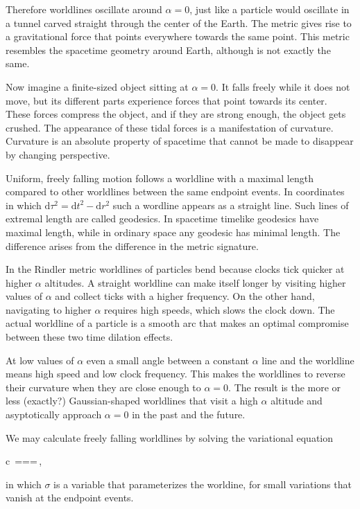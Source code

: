 \documentclass[11pt,oneside%
]{memoir}
\newenvironment{eqna}{\begin{IEEEeqnarray*}{c}}{\end{IEEEeqnarray*}\ignorespacesafterend}
\newcommand{\der}[2]{\frac{\dd#1}{\dd#2}}
\newcommand{\dd}{\mathrm{d}}
\begin{document}
Therefore worldlines oscillate around \(\alpha=0\), just like a particle would oscillate in a tunnel carved straight through the center of the Earth. The metric gives rise to a gravitational force that points everywhere towards the same point. This metric resembles the spacetime geometry around Earth, although is not exactly the same.

Now imagine a finite-sized object sitting at \(\alpha=0\). It falls freely while it does not move, but its different parts experience forces that point towards its center. These forces compress the object, and if they are strong enough, the object gets crushed. The appearance of these tidal forces is a manifestation of curvature. Curvature is an absolute property of spacetime that cannot be made to disappear by changing perspective.

Uniform, freely falling motion follows a worldline with a maximal length compared to other worldlines between the same endpoint events. In coordinates in which \(\dd\tau^2=\dd t^2-\dd r^2\) such a wordline appears as a straight line. Such lines of extremal length are called geodesics. In spacetime timelike geodesics have maximal length, while in ordinary space any geodesic has minimal length. The difference arises from the difference in the metric signature.

In the Rindler metric worldlines of particles bend because clocks tick quicker at higher \(\alpha\) altitudes. A straight worldline can make itself longer by visiting higher values of \(\alpha\) and collect ticks with a higher frequency. On the other hand, navigating to higher \(\alpha\) requires high speeds, which slows the clock down. The actual worldline of a particle is a smooth arc that makes an optimal compromise between these two time dilation effects.

At low values of \(\alpha\) even a small angle between a constant \(\alpha\) line and the worldline means high speed and low clock frequency. This makes the worldlines to reverse their curvature when they are close enough to \(\alpha=0\). The result is the more or less (exactly?) Gaussian-shaped worldlines that visit a high \(\alpha\) altitude and asyptotically approach \(\alpha=0\) in the past and the future.

We may calculate freely falling worldlines by solving the variational equation
\begin{eqna}
\delta\,\tau=\delta\int\dd\tau=\int\delta\dd\tau=\int\delta\der{\tau}{\sigma}\,\dd\sigma,
\end{eqna}
in which \(\sigma\) is a variable that parameterizes the worldine, for small variations that vanish at the endpoint events.
\end{document}
